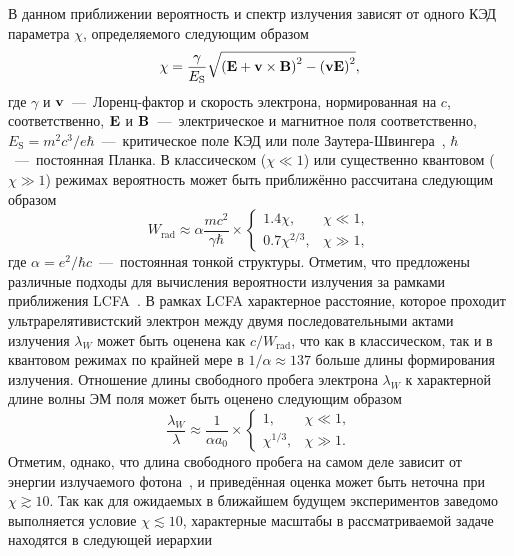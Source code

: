 В данном приближении вероятность и спектр излучения зависят от одного КЭД параметра $\chi$, определяемого следующим образом
\begin{equation}
    \label{eq:ch1/sec1/chi}
    \chi = \frac{\gamma}{E_\mathrm{S}} \sqrt{{\left( \vb{E} + \vb{v}\times\vb{B} \right)}^2 - {\left(\vb{v}\vb{E} \right)}^2} ,
\end{equation}
где $\gamma$ и $\vb{v}$~---~Лоренц-фактор и скорость электрона, нормированная на $c$, соответственно, $\vb{E}$ и $\vb{B}$~---~электрическое и магнитное поля соответственно, ${E_\mathrm{S} = m^2 c^3/e\hbar}$~---~критическое поле КЭД или поле Заутера-Швингера~\cite{berestetskii1982quantum}, $\hbar$~---~постоянная Планка.
В классическом ($\chi \ll 1$) или существенно квантовом ($\chi \gg 1$) режимах вероятность может быть приближённо рассчитана следующим образом
\begin{equation}
    W_\mathrm{rad} \approx \alpha \frac{m c^2}{\gamma\hbar} \times
    \begin{cases}
        1.4 \chi, & \chi \ll 1, \\
        0.7 \chi^{2/3}, & \chi \gg 1,
    \end{cases}
\end{equation}
где $\alpha = e^2/\hbar c$~---~постоянная тонкой структуры.
Отметим, что предложены различные подходы для вычисления вероятности излучения за рамками приближения LCFA~\cite{khokonov2002standard, ilderton2019extended, heinzl2020locally, gelfer2022nonlinear, Podszus19}.
В рамках LCFA характерное расстояние, которое проходит ультрарелятивистский электрон между двумя последовательными актами излучения $\lambda_W$ может быть оценена как $c/W_\mathrm{rad}$, что как в классическом, так и в квантовом режимах по крайней мере в $1/\alpha\approx137$ больше длины формирования излучения.
Отношение длины свободного пробега электрона $\lambda_W$ к характерной длине волны ЭМ поля может быть оценено следующим образом
\begin{equation}
    \frac{\lambda_W}{\lambda} \approx \frac{1}{\alpha a_0} \times
    \begin{cases}
        1, & \chi \ll 1, \\
        \chi^{1/3}, & \chi \gg 1.
    \end{cases}
\end{equation}
Отметим, однако, что длина свободного пробега на самом деле зависит от энергии излучаемого фотона~\cite{Artemenko20}, и приведённая оценка может быть неточна при $\chi \gtrsim 10$.
Так как для ожидаемых в ближайшем будущем экспериментов заведомо выполняется условие $\chi \lesssim 10$, характерные масштабы в рассматриваемой задаче находятся в следующей иерархии

